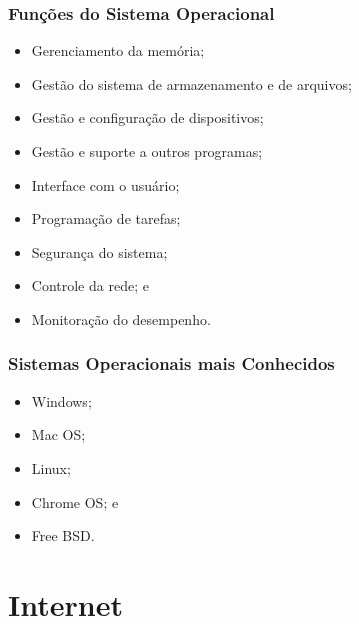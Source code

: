 \documentclass[aspectratio=169]{beamer} %
\begin{document}
\begin{frame}
	\frametitle{Funções do Sistema Operacional}
		
	\begin{itemize}
		\item Gerenciamento da memória;
		\item Gestão do sistema de armazenamento e de arquivos; 
		\item Gestão e configuração de dispositivos;
		\item Gestão e suporte a outros programas; 
		\item Interface com o usuário;
		\item Programação de tarefas;
		\item Segurança do sistema;
		\item Controle da rede; e
		\item Monitoração do desempenho.
	\end{itemize}
\end{frame}

\begin{frame}
	\frametitle{Sistemas Operacionais mais Conhecidos}
		
	\begin{itemize}
		\item Windows;
		\item Mac OS;
		\item Linux;
		\item Chrome OS; e
		\item Free BSD.
	\end{itemize}
\end{frame}

\section{Internet}
\end{document}
